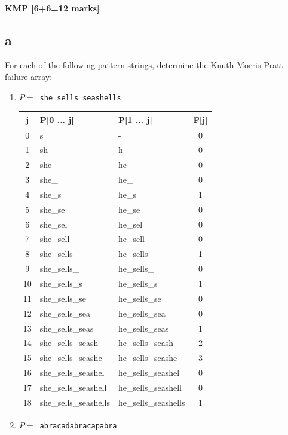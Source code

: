 \documentclass[12pt]{article}
\begin{document}
\subsection{KMP [6+6=12 marks]}
\begin{itemize}
\part{a} For each of the following pattern strings, determine the Knuth-Morris-Pratt
failure array:
\begin{enumerate}
\item $P = ${\tt~she sells seashells}

\begin{tabular}{c|l|l|c}
  \hline
  \textbf{j} & \textbf{P[0 ... j]} & \textbf{P[1 ... j]} & \textbf{F[j]}\\
  \hline
  0 & s & - & 0\\
  1 & sh & h & 0 \\
  2 & she & he & 0 \\
  3 & she\_ & he\_ & 0 \\
  4 & she\_s & he\_s & 1 \\
  5 & she\_se & he\_se & 0 \\
  6 & she\_sel & he\_sel & 0 \\
  7 & she\_sell & he\_sell & 0 \\
  8 & she\_sells & he\_sells & 1 \\
  9 & she\_sells\_ & he\_sells\_ & 0 \\
  10 & she\_sells\_s & he\_sells\_s & 1 \\
  11 & she\_sells\_se & he\_sells\_se & 0 \\
  12 & she\_sells\_sea & he\_sells\_sea & 0 \\
  13 & she\_sells\_seas & he\_sells\_seas & 1 \\
  14 & she\_sells\_seash & he\_sells\_seash & 2 \\
  15 & she\_sells\_seashe & he\_sells\_seashe & 3 \\
  16 & she\_sells\_seashel & he\_sells\_seashel & 0 \\
  17 & she\_sells\_seashell & he\_sells\_seashell & 0 \\
  18 & she\_sells\_seashells & he\_sells\_seashells & 1
\end{tabular}

\item $P = ${\tt~abracadabracapabra}


\end{enumerate}
\end{itemize}
\end{document}
